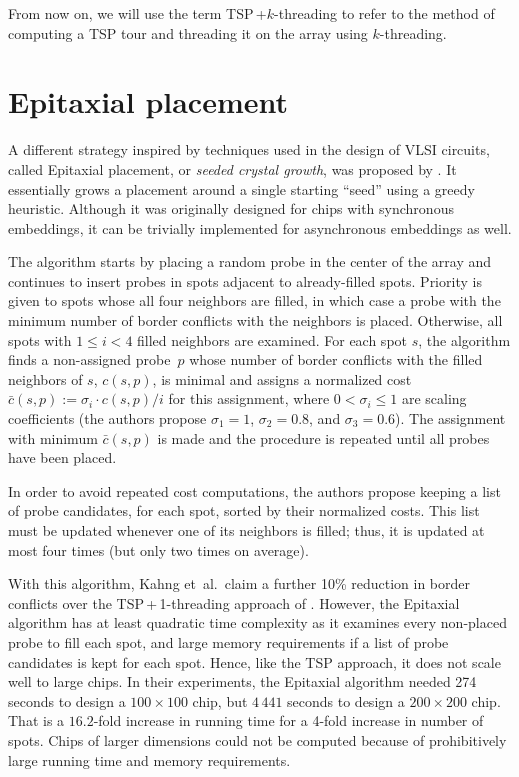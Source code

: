 From now on, we will use the term TSP\,+$k$-threading to refer to the method of
computing a TSP tour and threading it on the array using $k$-threading.

\section{Epitaxial placement}
\label{sec:placement_epitaxial}

A different strategy inspired by techniques used in the design of VLSI circuits,
called Epitaxial placement, or \emph{seeded crystal growth}, was proposed by
\citet{Kahng2002}. It essentially grows a placement around a single starting
``seed'' using a greedy heuristic. Although it was originally designed for chips
with synchronous embeddings, it can be trivially implemented for asynchronous
embeddings as well.

The algorithm starts by placing a random probe in the center of the array and
continues to insert probes in spots adjacent to already-filled spots. Priority
is given to spots whose all four neighbors are filled, in which case a probe
with the minimum number of border conflicts with the neighbors is placed.
Otherwise, all spots with $1 \leq i < 4$ filled neighbors are examined. For each
spot $s$, the algorithm finds a non-assigned probe~$p$ whose number of border
conflicts with the filled neighbors of $s$, $c(s,p)$, is minimal and assigns a
normalized cost $\bar{c}(s,p) := \sigma_i \cdot c(s,p) / i$ for this assignment,
where $0 < \sigma_i \leq 1$ are scaling coefficients (the authors propose
$\sigma_1 = 1$, $\sigma_2 = 0.8$, and $\sigma_3 = 0.6$). The assignment with
minimum $\bar{c}(s,p)$ is made and the procedure is repeated until all probes
have been placed.

In order to avoid repeated cost computations, the authors propose keeping a list
of probe candidates, for each spot, sorted by their normalized costs. This list
must be updated whenever one of its neighbors is filled; thus, it is updated at
most four times (but only two times on average).

With this algorithm, Kahng et~al.\ claim a further 10\% reduction in
border conflicts over the TSP\,+\,1-threading approach of
\citet{Hannenhalli2002}. However, the Epitaxial algorithm has
at least quadratic time complexity as it examines every non-placed probe to fill
each spot, and large memory requirements if a list of probe candidates is kept
for each spot. Hence, like the TSP approach, it does not scale well to large
chips. In their experiments, the Epitaxial algorithm needed 274 seconds to
design a $100\times 100$ chip, but $4\,441$ seconds to design a $200\times 200$
chip. That is a $16.2$-fold increase in running time for a 4-fold increase in
number of spots. Chips of larger dimensions could not be computed because of
prohibitively large running time and memory requirements.

